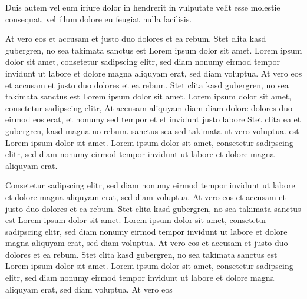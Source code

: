 \documentclass[]{../metanetpaper}
\begin{document}
\begin{Parallel}[c]{80mm}{80mm}
{    Duis autem vel eum iriure dolor in hendrerit in vulputate velit esse molestie consequat, vel illum dolore eu feugiat nulla facilisis.   

    At vero eos et accusam et justo duo dolores et ea rebum. Stet clita kasd gubergren, no sea takimata sanctus est Lorem ipsum dolor sit amet. Lorem ipsum dolor sit amet, consetetur sadipscing elitr, sed diam nonumy eirmod tempor invidunt ut labore et dolore magna aliquyam erat, sed diam voluptua. At vero eos et accusam et justo duo dolores et ea rebum. Stet clita kasd gubergren, no sea takimata sanctus est Lorem ipsum dolor sit amet. Lorem ipsum dolor sit amet, consetetur sadipscing elitr, At accusam aliquyam diam diam dolore dolores duo eirmod eos erat, et nonumy sed tempor et et invidunt justo labore Stet clita ea et gubergren, kasd magna no rebum. sanctus sea sed takimata ut vero voluptua. est Lorem ipsum dolor sit amet. Lorem ipsum dolor sit amet, consetetur sadipscing elitr, sed diam nonumy eirmod tempor invidunt ut labore et dolore magna aliquyam erat.   

    Consetetur sadipscing elitr, sed diam nonumy eirmod tempor invidunt ut labore et dolore magna aliquyam erat, sed diam voluptua. At vero eos et accusam et justo duo dolores et ea rebum. Stet clita kasd gubergren, no sea takimata sanctus est Lorem ipsum dolor sit amet. Lorem ipsum dolor sit amet, consetetur sadipscing elitr, sed diam nonumy eirmod tempor invidunt ut labore et dolore magna aliquyam erat, sed diam voluptua. At vero eos et accusam et justo duo dolores et ea rebum. Stet clita kasd gubergren, no sea takimata sanctus est Lorem ipsum dolor sit amet. Lorem ipsum dolor sit amet, consetetur sadipscing elitr, sed diam nonumy eirmod tempor invidunt ut labore et dolore magna aliquyam erat, sed diam voluptua. At vero eos
  }
  
\end{Parallel}
\end{document}
